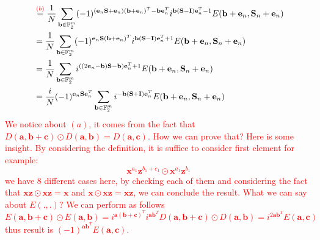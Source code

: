 \documentclass{article}
\begin{document}
\begin{align*}
		&\stackrel{\textcolor{red}{(b)}}{=}\frac{1}{N} \sum_{\mathbf{b}\in \mathbb{F}_2^m}(-1)^{(\mathbf{e}_n\mathbf{S}+\mathbf{e}_n)(\mathbf{b}+\mathbf{e}_n)^T-\mathbf{b}\mathbf{e}_n^T} i^{\mathbf{b(S-I)}\mathbf{e}_n^T - 1}E(\mathbf{b}+\mathbf{e}_n,\mathbf{S}_n+\mathbf{e}_n) \\
		&=\frac{1}{N} \sum_{\mathbf{b}\in \mathbb{F}_2^m}(-1)^{\mathbf{e}_n\mathbf{S}(\mathbf{b}+\mathbf{e}_n)^T} i^{\mathbf{b(S-I)}\mathbf{e}_n^T + 1}E(\mathbf{b}+\mathbf{e}_n,\mathbf{S}_n+\mathbf{e}_n)\\
		&=\frac{1}{N} \sum_{\mathbf{b}\in \mathbb{F}_2^m} i^{((2\mathbf{e}_n-\mathbf{b})\mathbf{S}-\mathbf{b})\mathbf{e}_n^T + 1}E(\mathbf{b}+\mathbf{e}_n,\mathbf{S}_n+\mathbf{e}_n) \\
		&=\frac{i}{N}(-1)^{\mathbf{e}_n\mathbf{S}\mathbf{e}_n^T} \sum_{\mathbf{b}\in \mathbb{F}_2^m} i^{-\mathbf{b}(\mathbf{S}+\mathbf{I})\mathbf{e}_n^T }E(\mathbf{b}+\mathbf{e}_n,\mathbf{S}_n+\mathbf{e}_n)
	\end{align*}
	\textcolor{red}{
		We notice about $(a)$, it comes from the fact that $D(\mathbf{a, b+c}) \odot D(\mathbf{a, b})=D(\mathbf{a, c})$. How we can prove that? Here is some insight. By considering the definition, it is suffice to consider first element for example:
		\begin{equation*}
			\mathbf{x}^{a_1}\mathbf{z}^{b_1+c_1} \odot \mathbf{x}^{a_1}\mathbf{z}^{b_1}
		\end{equation*}
		we have 8 different cases here, by checking each of them and considering the fact that $\mathbf{x}\mathbf{z}\odot \mathbf{x}\mathbf{z} = \mathbf{x}$ and $\mathbf{x}\odot \mathbf{x}\mathbf{z} = \mathbf{x}\mathbf{z}$, we can conclude the result. What we can say about $E(.,.)$? We can perform as follows
		\begin{equation*}
			E(\mathbf{a,b+c}) \odot E(\mathbf{a,b}) = i^{\mathbf{a}(\mathbf{b+c})^T}i^{\mathbf{a}\mathbf{b}^T}D(\mathbf{a,b+c}) \odot D(\mathbf{a,b}) = i^{2\mathbf{a}\mathbf{b}^T} E(\mathbf{a,c})
		\end{equation*}
		thus result is  $(-1)^{\mathbf{a}\mathbf{b}^T}E(\mathbf{a,c})$.
	}
	\\
	
	
\end{document}
